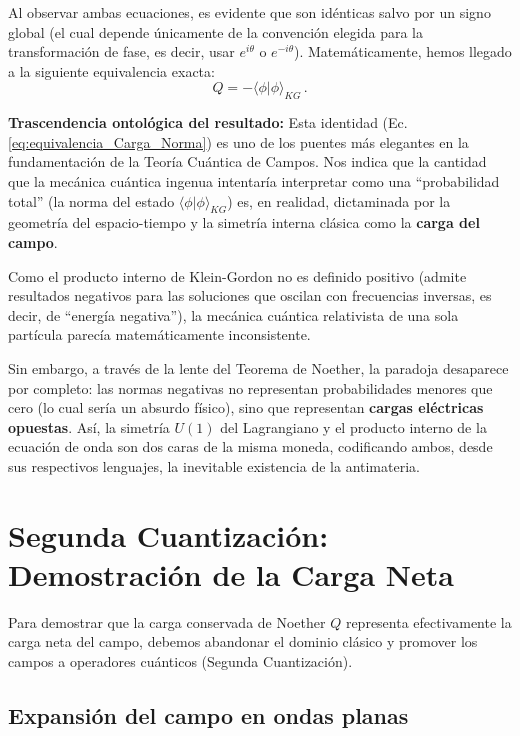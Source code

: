 Al observar ambas ecuaciones, es evidente que son idénticas salvo por un signo global (el cual depende únicamente de la convención elegida para la transformación de fase, es decir, usar $e^{i\theta}$ o $e^{-i\theta}$). Matemáticamente, hemos llegado a la siguiente equivalencia exacta:
\begin{equation}
    Q = - \langle \phi | \phi \rangle_{KG} \, .
    \label{eq:equivalencia_Carga_Norma}
\end{equation}

\textbf{Trascendencia ontológica del resultado:} 
Esta identidad (Ec. \eqref{eq:equivalencia_Carga_Norma}) es uno de los puentes más elegantes en la fundamentación de la Teoría Cuántica de Campos. Nos indica que la cantidad que la mecánica cuántica ingenua intentaría interpretar como una ``probabilidad total'' (la norma del estado $\langle \phi | \phi \rangle_{KG}$) es, en realidad, dictaminada por la geometría del espacio-tiempo y la simetría interna clásica como la \textbf{carga del campo}.

Como el producto interno de Klein-Gordon no es definido positivo (admite resultados negativos para las soluciones que oscilan con frecuencias inversas, es decir, de ``energía negativa''), la mecánica cuántica relativista de una sola partícula parecía matemáticamente inconsistente. 

Sin embargo, a través de la lente del Teorema de Noether, la paradoja desaparece por completo: las normas negativas no representan probabilidades menores que cero (lo cual sería un absurdo físico), sino que representan \textbf{cargas eléctricas opuestas}. Así, la simetría $U(1)$ del Lagrangiano y el producto interno de la ecuación de onda son dos caras de la misma moneda, codificando ambos, desde sus respectivos lenguajes, la inevitable existencia de la antimateria.


\section{Segunda Cuantización: Demostración de la Carga Neta}
\label{sec:segunda_cuantizacion_carga}

Para demostrar que la carga conservada de Noether $Q$ representa efectivamente la carga neta del campo, debemos abandonar el dominio clásico y promover los campos a operadores cuánticos (Segunda Cuantización). 

\subsection{Expansión del campo en ondas planas}

